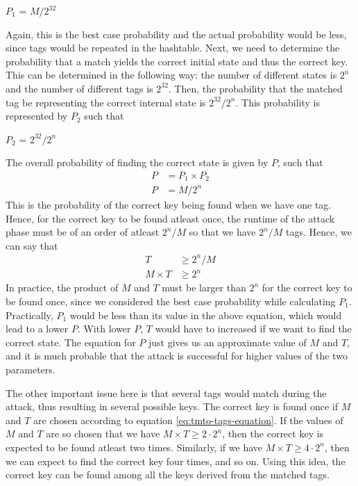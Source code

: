 \begin{center}
$P_1$ = $M/2^{32}$
\end{center}

Again, this is the best case probability and the actual probability would be less, since tags would be repeated in the hashtable. Next, we need to determine the probability that a match yields the correct initial state and thus the correct key. This can be determined in the following way: the number of different states is $2^n$ and the number of different tags is $2^{32}$. Then, the probability that the matched tag be representing the correct internal state is $2^{32}/2^n$. This probability is represented by $P_2$ such that
\begin{center}
$P_2$ = $2^{32}/2^n$
\end{center}
The overall probability of finding the correct state is given by $P$, such that
\begin{align*}
P &= P_1 \times P_2\\
P &= M/2^{n}
\end{align*}
This is the probability of the correct key being found when we have one tag. Hence, for the correct key to be found atleast once, the runtime of the attack phase must be of an order of atleast $2^{n}/M$ so that we have $2^{n}/M$ tags. Hence, we can say that
\begin{align}
T &\geq 2^{n}/M\\
\label{eq:tmto-tags-equation} M \times T &\geq 2^{n}
\end{align}
In practice, the product of $M$ and $T$ must be larger than $2^n$ for the correct key to be found once, since we considered the best case probability while calculating $P_1$. Practically, $P_1$ would be less than its value in the above equation, which would lead to a lower $P$. With lower $P$, $T$ would have to increased if we want to find the correct state. The equation for $P$ just gives us an approximate value of $M$ and $T$, and it is much probable that the attack is successful for higher values of the two parameters.

The other important issue here is that several tags would match during the attack, thus resulting in several possible keys. The correct key is found once if $M$ and $T$ are chosen according to equation \ref{eq:tmto-tags-equation}. If the values of $M$ and $T$ are so chosen that we have $M \times T \geq 2 \cdot 2^{n}$, then the correct key is expected to be found atleast two times. Similarly, if we have $M \times T \geq 4 \cdot 2^{n}$, then we can expect to find the correct key four times, and so on. Using this idea, the correct key can be found among all the keys derived from the matched tags. 

